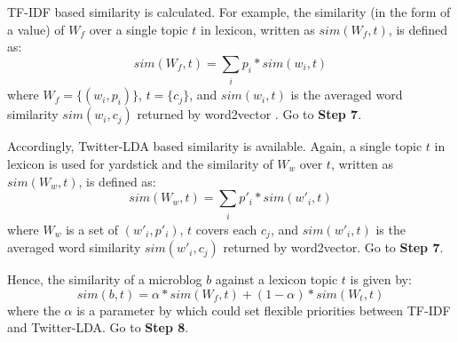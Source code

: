  TF-IDF based similarity is calculated.
For example, the similarity (in the form of a value) of $W_f$ over a single topic $t$ in lexicon, written as $sim(W_f, t)$, is defined as:
\begin{equation}
\label{eq:sim-tf1}
sim(W_f, t) = \sum_{\substack{i}} p_i*sim(w_i, t)
\end{equation}
where $W_f = \{(w_i, p_i)\}$, $t = \{c_j\}$, and $sim(w_i, t)$ is the averaged word similarity $sim(w_i, c_j)$ returned by word2vector \cite{IEEEexample:mikolov2013distributed}.
Go to \textbf{Step 7}.

\begin{comment}
:
\begin{equation}
\label{eq:sim-tf2}
sim(w_i, t) = \sum_{\substack{j}} sim(w_i, c_j)
\end{equation}
\end{comment}



 Accordingly, Twitter-LDA based similarity is available.
Again, a single topic $t$ in lexicon is used for yardstick and the similarity of $W_w$ over $t$, written as $sim(W_w, t)$, is defined as:
\begin{equation}
\label{eq:sim-tw1}
sim(W_w, t) = \sum_{\substack{i}} p'_i*sim(w'_i, t)
\end{equation}
where $W_w$ is a set of $(w'_i, p'_i)$, $t$ covers each $c_j$,
and $sim(w'_i, t)$ is the averaged word similarity $sim(w'_i, c_j)$ returned by word2vector.
Go to \textbf{Step 7}.

\begin{comment}
:
\begin{equation}
\label{eq:sim-tw2}
sim(w'_i, t) = \sum_{\substack{j}} sim(w'_i, c_j)
\end{equation}
\end{comment}



 Hence, the similarity of a microblog $b$ against a lexicon topic $t$ is given by:
\begin{equation}
\label{eq:simbt}
sim(b, t) = \alpha * sim(W_f, t) + (1 - \alpha) * sim(W_t, t)
\end{equation}
where the $\alpha$ is a parameter by which \sys{} could set flexible priorities between TF-IDF and Twitter-LDA.
Go to \textbf{Step 8}.

